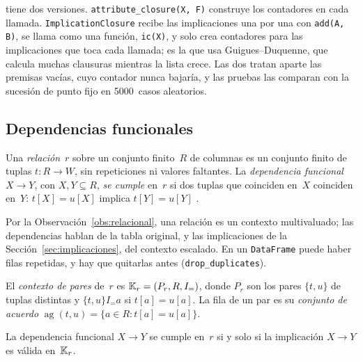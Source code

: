  tiene dos versiones. \texttt{attribute\_closure(X, F)} construye los contadores en cada llamada. \texttt{ImplicationClosure} recibe las implicaciones una por una con \texttt{add(A, B)}, se llama como una función, \texttt{ic(X)}, y solo crea contadores para las implicaciones que toca cada llamada; es la que usa Guigues--Duquenne, que calcula muchas clausuras mientras la lista crece. Las dos tratan aparte las premisas vacías, cuyo contador nunca bajaría, y las pruebas las comparan con la sucesión de punto fijo en 5000~casos aleatorios.


\subsection{Dependencias funcionales}
\label{sec:dependencias}

\begin{definicion}\label{def:df}
Una \emph{relación}~$r$ sobre un conjunto finito~$R$ de columnas es un conjunto finito de tuplas $t \colon R \to W$, sin repeticiones ni valores faltantes. La \emph{dependencia funcional} $X \to Y$, con $X, Y \subseteq R$, \emph{se cumple} en~$r$ si dos tuplas que coinciden en~$X$ coinciden en~$Y$: $t[X] = u[X]$ implica $t[Y] = u[Y]$ \parencite{maier1983, abiteboul1995}.
\end{definicion}

Por la Observación~\ref{obs:relacional}, una relación es un contexto multivaluado; las dependencias hablan de la tabla original, y las implicaciones de la Sección~\ref{sec:implicaciones}, del contexto escalado. En un \texttt{DataFrame} puede haber filas repetidas, y hay que quitarlas antes (\texttt{drop\_duplicates}).

\begin{definicion}\label{def:pares}
El \emph{contexto de pares} de~$r$ es $\mathbb{K}_r = (P_r, R, I_{=})$, donde $P_r$ son los pares $\{t, u\}$ de tuplas distintas y $\{t, u\} \mathrel{I_{=}} a$ si $t[a] = u[a]$. La fila de un par es su \emph{conjunto de acuerdo} $\operatorname{ag}(t, u) = \{ a \in R : t[a] = u[a] \}$.
\end{definicion}

\begin{teorema}\label{teo:df-implicaciones}
La dependencia funcional $X \to Y$ se cumple en~$r$ si y solo si la implicación $X \to Y$ es válida en~$\mathbb{K}_r$.
\end{teorema}

